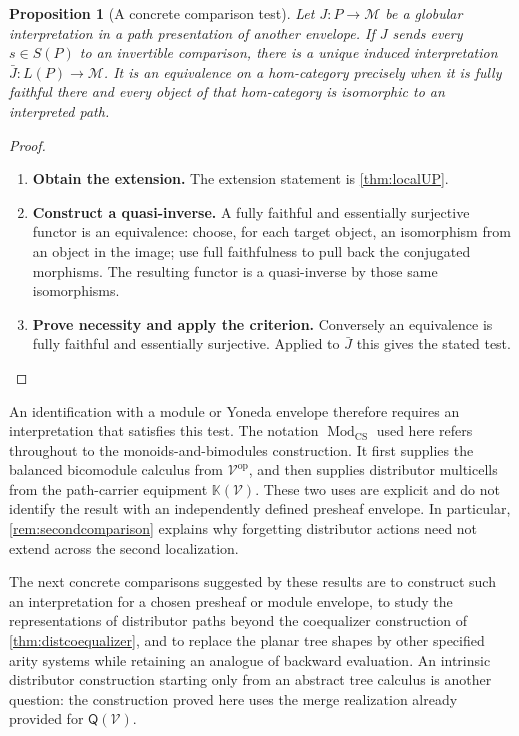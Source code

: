 \documentclass[11pt,reqno]{amsart}
\theoremstyle{plain}
\newtheorem{proposition}[theorem]{Proposition}
\theoremstyle{definition}
\theoremstyle{remark}
\numberwithin{equation}{section}
\newcommand{\V}{\mathcal V}
\newcommand{\Q}{\mathsf Q}
\newcommand{\Kcal}{\mathbb K}
\newcommand{\op}{\mathrm{op}}
\newcommand{\Mod}{\operatorname{Mod}_{\mathrm{CS}}}
\begin{document}
\begin{proposition}[A concrete comparison test]\label{prop:envelopetest}
Let $J:P\to\mathcal M$ be a globular interpretation in a path
presentation of another envelope. If $J$ sends every $s\in S(P)$
to an invertible comparison, there is a unique induced interpretation
$\bar J:L(P)\to\mathcal M$. It is an equivalence on a hom-category
precisely when it is fully faithful there and every object of that
hom-category is isomorphic to an interpreted path.
\end{proposition}
\begin{proof}\leavevmode
\begin{enumerate}
\item \textbf{Obtain the extension.} The extension statement is \cref{thm:localUP}.

\item \textbf{Construct a quasi-inverse.} A fully faithful
and essentially surjective functor is an equivalence: choose, for
each target object, an isomorphism from an object in the image; use
full faithfulness to pull back the conjugated morphisms. The resulting
functor is a quasi-inverse by those same isomorphisms.

\item \textbf{Prove necessity and apply the criterion.} Conversely an
equivalence is fully faithful and essentially surjective. Applied
to $\bar J$ this gives the stated test.\qedhere
\end{enumerate}
\end{proof}

An identification with a module or Yoneda envelope therefore requires
an interpretation that satisfies this test. The notation $\Mod$ used
here refers throughout to the monoids-and-bimodules construction. It
first supplies the balanced bicomodule calculus from $\V^\op$, and
then supplies distributor multicells from the path-carrier equipment
$\Kcal(\V)$. These two uses are explicit and do not identify the
result with an independently defined presheaf envelope. In particular,
\cref{rem:secondcomparison} explains why forgetting distributor actions
need not extend across the second localization.

The next concrete comparisons suggested by these results are to construct
such an interpretation for a chosen presheaf or module envelope, to study
the representations of distributor paths beyond the coequalizer
construction of \cref{thm:distcoequalizer}, and to replace the planar
tree shapes by other specified arity systems while retaining an analogue
of backward evaluation. An intrinsic distributor construction starting
only from an abstract tree calculus is another question: the construction
proved here uses the merge realization already provided for $\Q(\V)$.
\end{document}
